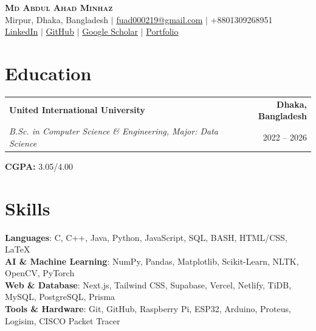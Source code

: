 \documentclass[letterpaper,9pt]{article}
\makeatletter
\newcommand{\resumeSubheading}[4]{
  \vspace{-1pt}\item
    \begin{tabular*}{0.97\textwidth}{l@{\extracolsep{\fill}}r}
      \textbf{#1} & \textcolor{AccentColor}{\textbf{#2}} \\
      \small\textit{#3} & \small #4 \\
    \end{tabular*}\vspace{-4pt}
}
\newcommand{\resumeSubHeadingListStart}{\begin{itemize}[leftmargin=0.15in, label={}, itemsep=1pt]}
\newcommand{\resumeSubHeadingListEnd}{\end{itemize}\vspace{-10pt}}
\makeatother
\begin{document}
\begin{center}
    \textbf{\Huge \scshape \textcolor{AccentColor}{Md Abdul Ahad Minhaz}} \\ \vspace{4pt}
    \small Mirpur, Dhaka, Bangladesh $|$ \href{mailto:fuad000219@gmail.com}{fuad000219@gmail.com} $|$ +8801309268951 \\ \vspace{3pt}
    \small
    \href{#}{LinkedIn} $|$
    \href{https://github.com/MinhazFuad}{GitHub} $|$
    \href{https://scholar.google.com/citations?user=5dM3OOEAAAAJ&hl=en}{Google Scholar} $|$
    \href{#}{Portfolio}
\end{center}
\vspace{-16pt}
    
\section{Education}
  \resumeSubHeadingListStart
    \resumeSubheading
      {United International University}{Dhaka, Bangladesh}
      {B.Sc. in Computer Science \& Engineering, Major: Data Science}{2022 -- 2026}
      \vspace{-2pt}\small{\item \textbf{CGPA:} 3.05/4.00}
  \resumeSubHeadingListEnd
    
\section{Skills}
 \begin{itemize}[leftmargin=0.15in, label={}, itemsep=1pt]
    \small{\item{
     \textbf{Languages}{: C, C++, Java, Python, JavaScript, SQL, BASH, HTML/CSS, LaTeX} \\[3pt]
     \textbf{AI \& Machine Learning}{: NumPy, Pandas, Matplotlib, Scikit-Learn, NLTK, OpenCV, PyTorch} \\[3pt]
     \textbf{Web \& Database}{: Next.js, Tailwind CSS, Supabase, Vercel, Netlify, TiDB, MySQL, PostgreSQL, Prisma} \\[3pt]
     \textbf{Tools \& Hardware}{: Git, GitHub, Raspberry Pi, ESP32, Arduino, Proteus, Logisim, CISCO Packet Tracer}
    }}
 \end{itemize}
 \vspace{-10pt}
    
\end{document}
